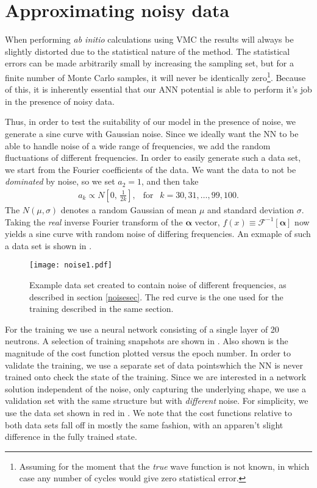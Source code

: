 \documentclass[../../master.tex]{subfiles}
\begin{document}
\section{Approximating noisy data \label{noisesec}}
When performing \emph{ab initio} calculations using VMC the results will always be slightly distorted due to the statistical nature of the method. The statistical errors can be made arbitrarily small by increasing the sampling set, but for a finite number of Monte Carlo samples, it will never be identically zero\footnote{Assuming for the moment that the \emph{true} wave function is not known, in which case any number of cycles would give zero statistical error.}. Because of this, it is inherently essential that our ANN potential is able to perform it's job in the presence of noisy data. 

Thus, in order to test the suitability of our model in the presence of noise, we generate a sine curve with Gaussian noise. Since we ideally want the NN to be able to handle noise of a wide range of frequencies, we add the random fluctuations of different frequencies. In order to easily generate such a data set, we start from the Fourier coefficients of the data. We want the data to not be \emph{dominated} by noise, so we set $a_2=1$, and then take
\begin{align}
a_k\propto N\left[0,\,\frac{1}{2k}\right], \ \ \text{ for } \ \ k=30,31,\dots,99,100.
\end{align}
The $N(\mu,\sigma)$ denotes a random Gaussian of mean $\mu$ and standard deviation $\sigma$. Taking the \emph{real} inverse Fourier transform of the $\bm{\alpha}$ vector, $f(x)\equiv\mathcal{F}^{-1}[\bm{\alpha}]$ now yields a sine curve with random noise of differing frequencies. An exmaple of such a data set is shown in .  
\begin{SCfigure}
\centering
\texttt{[image: noise1.pdf]}
\caption{Example data set created to contain noise of different frequencies, as described in section \ref{noisesec}. The red curve is the one used for the training described in the same section.\label{fig:noise1}}
\end{SCfigure}

For the training we use a neural network consisting of a single layer of 20 neutrons. A selection of training snapshots are shown in . Also shown is the magnitude of the cost function plotted versus the epoch number. In order to validate the training, we use a separate set of data points\textemdash which the NN is never trained on\textemdash to check the state of the training. Since we are interested in a network solution independent of the noise, only capturing the underlying shape, we use a validation set with the same structure but with \emph{different} noise. For simplicity, we use the data set shown in red in . We note that the cost functions relative to both data sets fall off in mostly the same fashion, with an apparen't slight difference in the fully trained state. 
\end{document}
